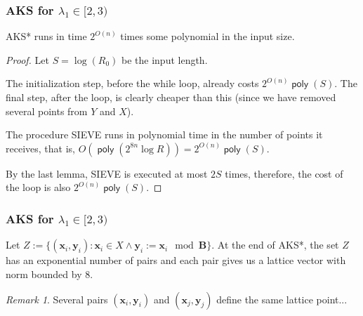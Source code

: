 \documentclass[aspectratio=43]{beamer}
\DeclareMathOperator{\poly}{\textsf{poly}}
\let\vec\mathbf %
\theoremstyle{remark}
\newtheorem*{remark}{Remark}
\begin{document}
\begin{frame}
\frametitle{AKS for $\lambda_1 \in [2, 3)$}

\begin{lemma}
{\sc AKS*} runs in time $2^{O(n)}$ times some polynomial in the
input size.
\end{lemma}

\pause
\begin{proof}
	
	Let $S = \log(R_0)$ be the input length.
	\vspace*{0.1cm}
	
	The initialization step, before the while loop, already costs 
	$2^{O(n)}\poly(S)$. The final step, after the loop, is clearly cheaper than 
	this (since we have removed several points from $Y$ and $X$).
	\vspace*{0.1cm}	
	
	The procedure {\sc SIEVE} runs in polynomial time in the number of points 
	it receives, that is, $O(\poly(2^{8n}\log R)) = 2^{O(n)}\poly(S)$.
	\vspace*{0.1cm}
	
	By the last lemma, {\sc SIEVE} is executed at most $2S$ times,
	therefore, the cost of the loop is also $2^{O(n)}\poly(S)$.
\end{proof}

\end{frame}


\begin{frame}
\frametitle{AKS for $\lambda_1 \in [2, 3)$}

\begin{lemma}
Let $Z := \{(\vec{x}_i, \vec{y}_i) : \vec{x}_i \in X \land \vec{y}_i := 
\vec{x}_i \mod \vec B \}$.
At the end of {\sc AKS*}, the set $Z$ has an exponential number of pairs 
and each pair gives us a lattice vector with norm bounded by $8$.
\end{lemma}

\begin{remark}
Several pairs $(\vec{x}_i, \vec{y}_i)$ and $(\vec{x}_j, \vec{y}_j)$ define the 
same lattice point...
\end{remark}

\end{frame}
\end{document}
